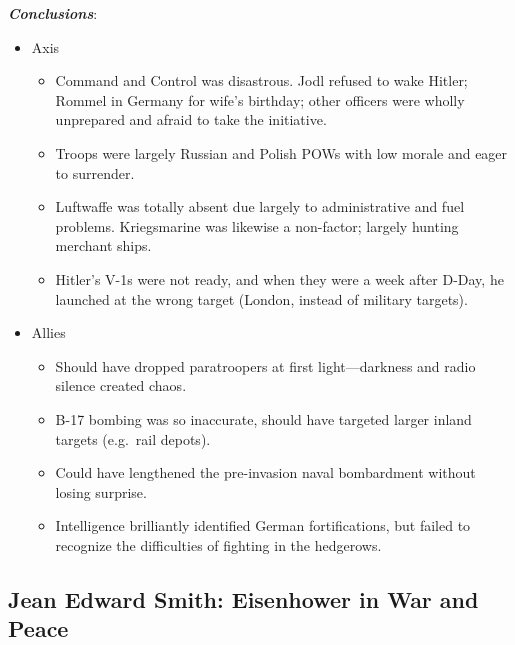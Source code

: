 \documentclass[
]{article}
\begin{document}
\textbf{\emph{Conclusions}}:

\begin{itemize}
\item
  Axis

  \begin{itemize}
  \item
    Command and Control was disastrous. Jodl refused to wake Hitler;
    Rommel in Germany for wife's birthday; other officers were wholly
    unprepared and afraid to take the initiative.
  \item
    Troops were largely Russian and Polish POWs with low morale and
    eager to surrender.
  \item
    Luftwaffe was totally absent due largely to administrative and fuel
    problems. Kriegsmarine was likewise a non-factor; largely hunting
    merchant ships.
  \item
    Hitler's V-1s were not ready, and when they were a week after D-Day,
    he launched at the wrong target (London, instead of military
    targets).
  \end{itemize}
\item
  Allies

  \begin{itemize}
  \item
    Should have dropped paratroopers at first light---darkness and radio
    silence created chaos.
  \item
    B-17 bombing was so inaccurate, should have targeted larger inland
    targets (e.g.~rail depots).
  \item
    Could have lengthened the pre-invasion naval bombardment without
    losing surprise.
  \item
    Intelligence brilliantly identified German fortifications, but
    failed to recognize the difficulties of fighting in the hedgerows.
  \end{itemize}
\end{itemize}

\hypertarget{jean-edward-smith-eisenhower-in-war-and-peace}{%
\subsection{Jean Edward Smith: Eisenhower in War and
Peace}\label{jean-edward-smith-eisenhower-in-war-and-peace}}
\end{document}
